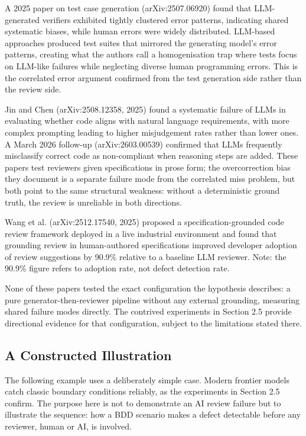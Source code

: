\documentclass{article}
\begin{document}
A 2025 paper on test case generation (arXiv:2507.06920) found that
LLM-generated verifiers exhibited tightly clustered error patterns,
indicating shared systematic biases, while human errors were widely
distributed. LLM-based approaches produced test suites that mirrored the
generating model's error patterns, creating what the authors call a
homogenisation trap where tests focus on LLM-like failures while
neglecting diverse human programming errors. This is the correlated error
argument confirmed from the test generation side rather than the review
side.

Jin and Chen (arXiv:2508.12358, 2025) found a systematic failure of LLMs
in evaluating whether code aligns with natural language requirements, with
more complex prompting leading to higher misjudgement rates rather than
lower ones. A March 2026 follow-up (arXiv:2603.00539) confirmed that LLMs
frequently misclassify correct code as non-compliant when reasoning steps
are added. These papers test reviewers given specifications in prose form;
the overcorrection bias they document is a separate failure mode from the
correlated miss problem, but both point to the same structural weakness:
without a deterministic ground truth, the review is unreliable in both
directions.

Wang et al. (arXiv:2512.17540, 2025) proposed a specification-grounded
code review framework deployed in a live industrial environment and found
that grounding review in human-authored specifications improved developer
adoption of review suggestions by 90.9\% relative to a baseline LLM
reviewer. Note: the 90.9\% figure refers to adoption rate, not defect
detection rate.

None of these papers tested the exact configuration the hypothesis
describes: a pure generator-then-reviewer pipeline without any external
grounding, measuring shared failure modes directly. The contrived
experiments in Section 2.5 provide directional evidence for that
configuration, subject to the limitations stated there.

\subsection{A Constructed Illustration}

The following example uses a deliberately simple case. Modern frontier
models catch classic boundary conditions reliably, as the experiments in
Section 2.5 confirm. The purpose here is not to demonstrate an AI
review failure but to illustrate the sequence: how a BDD scenario makes
a defect detectable before any reviewer, human or AI, is involved.
\end{document}
